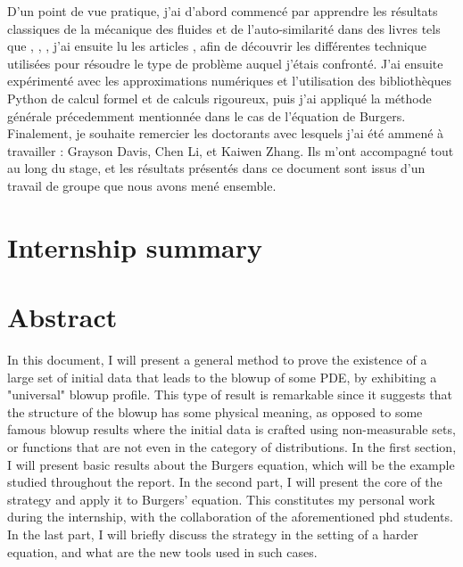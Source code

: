 \documentclass[11pt,a4paper]{article}
\begin{document}
D'un point de vue pratique, j'ai d'abord commencé par apprendre les résultats classiques de la mécanique des fluides et de l'auto-similarité dans des livres tels que \cite{majda2001vorticity}, \cite{eggers2015singularities}, \cite{tao2006dispersive}, j'ai ensuite lu les articles \cite{buckmaster2019formation},\cite{buckmaster2022imploding} afin de découvrir les différentes technique utilisées pour résoudre le type de problème auquel j'étais confronté. J'ai ensuite expérimenté avec les approximations numériques et l'utilisation des bibliothèques Python de calcul formel et de calculs rigoureux, puis j'ai appliqué la méthode générale précedemment mentionnée dans le cas de l'équation de Burgers. \\

Finalement, je souhaite remercier les doctorants avec lesquels j'ai été ammené à travailler : Grayson Davis, Chen Li, et Kaiwen Zhang. Ils m'ont accompagné tout au long du stage, et les résultats présentés dans ce document sont issus d'un travail de groupe que nous avons mené ensemble.

\newpage
{\centering
\section*{Internship summary}
}

\newpage
{\centering\section*{Abstract}}
In this document, I will present a general method to prove the existence of a large set of initial data that leads to the blowup of some PDE, by exhibiting a "universal" blowup profile. This type of result is remarkable since it suggests that the structure of the blowup has some physical meaning, as opposed to some famous blowup results where the initial data is crafted using non-measurable sets, or functions that are not even in the category of distributions.
In the first section, I will present basic results about the Burgers equation, which will be the example studied throughout the report. In the second part, I will present the core of the strategy and apply it to Burgers' equation. This constitutes my personal work during the internship, with the collaboration of the aforementioned phd students. In the last part, I will briefly discuss the strategy in the setting of a harder equation, and what are the new tools used in such cases. \\
\end{document}
